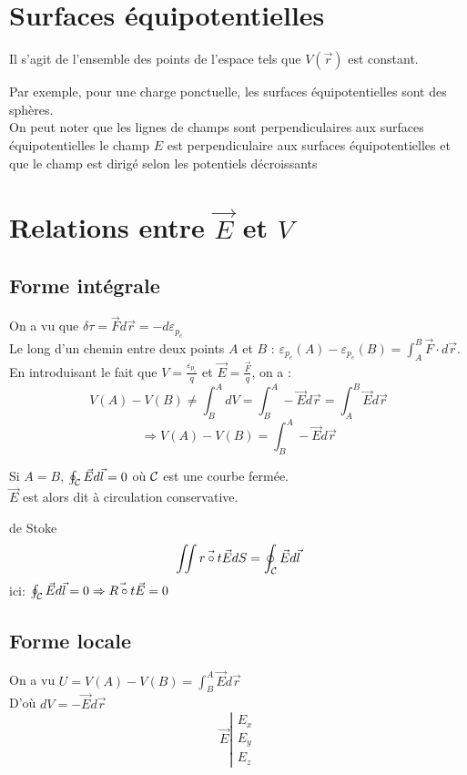 \documentclass[../main.tex]{subfile}
\begin{document}
\section{Surfaces équipotentielles}
Il s'agit de l'ensemble des points de l'espace tels que $V(\vec{r})$ est constant.

Par exemple, pour une charge ponctuelle, les surfaces équipotentielles sont des sphères.\\

On peut noter que les lignes de champs sont perpendiculaires aux surfaces équipotentielles
le champ $E$ est perpendiculaire aux surfaces équipotentielles 
et que le champ est dirigé selon les potentiels décroissants

\section{Relations entre $\vec{E}$ et $V$}
\subsection{Forme intégrale}
On a vu que $\delta \tau = \vec{F} d\vec{r} = -d \varepsilon_{p_e}$\\
Le long d'un chemin entre deux points $A$ et $B$ : $\varepsilon_{p_e}(A) - \varepsilon_{p_e}(B) = \int_A^B \vec{F} \cdot d\vec{r}$.
En introduisant le fait que $V = \frac{\varepsilon_{p_e}}{q}$ et $\vec{E} = \frac{\vec{F}}{q}$, on a :
$$V(A) - V(B) \neq \int_B^A dV = \int_B^A -\vec{E}d\vec{r} = \int_A^B \vec{E}d\vec{r}$$
$$\Rightarrow V(A) - V(B) = \int_B^A -\vec{E} d\vec{r}$$

\begin{rema}
	Si $A = B$, $\oint_{\mathcal{C}} \vec{E}d\vec{l} = 0$ où $\mathcal{C}$ est une courbe fermée.\\
	$\vec{E}$ est alors dit à circulation conservative.
\end{rema}

\begin{theo}{de Stoke}
	$$\iint \vec{r \circ t} \vec{E} dS = \oint_{\mathcal{C}} \vec{E} d\vec{l}$$
	ici:  $\oint_{\mathcal{C}} \vec{E} d\vec{l} = 0 \Rightarrow \vec{R \circ t} \vec{E} = 0$
\end{theo}

\subsection{Forme locale}
On a vu $U = V(A) - V(B) = \int_B^A \vec{E} d\vec{r}$\\
D'où $dV = -\vec{E} d\vec{r}$
$$\vec{E} 
\left|
\begin{array}{l}
	E_x\\
	E_y\\
	E_z
\end{array}
\right.$$
\end{document}
